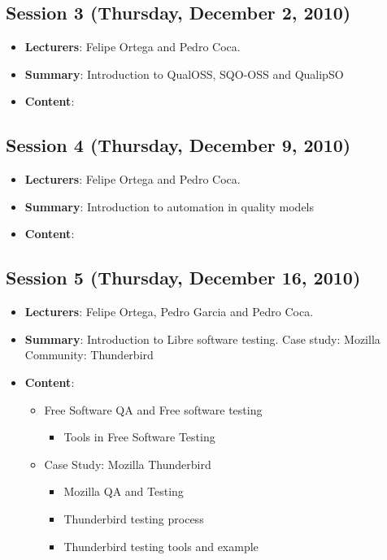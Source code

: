 \documentclass[a4paper]{article}
\begin{document}
\subsection{Session 3 (Thursday, December 2, 2010)}

\begin{itemize}
 \item \textbf{Lecturers}: Felipe Ortega and Pedro Coca.
 \item \textbf{Summary}: Introduction to QualOSS, SQO-OSS and QualipSO
 \item \textbf{Content}:


\end{itemize}

\subsection{Session 4 (Thursday, December 9, 2010)}

\begin{itemize}
 \item \textbf{Lecturers}: Felipe Ortega and Pedro Coca.
 \item \textbf{Summary}: Introduction to automation in quality models
 \item \textbf{Content}:

   


\end{itemize}

\subsection{Session 5 (Thursday, December 16, 2010)}

\begin{itemize}
 \item \textbf{Lecturers}: Felipe Ortega, Pedro Garcia and Pedro Coca.
 \item \textbf{Summary}: Introduction to Libre software testing. Case study: Mozilla Community: Thunderbird
 \item \textbf{Content}:

    \begin{itemize}

     \item Free Software QA and Free software testing

      \begin{itemize}
       \item Tools in Free Software Testing
      \end{itemize}

     \item Case Study: Mozilla Thunderbird

        \begin{itemize}
         \item Mozilla QA and Testing
         \item Thunderbird testing process
         \item Thunderbird testing tools and example
        \end{itemize}

    \end{itemize}
   

\end{itemize}
\end{document}

